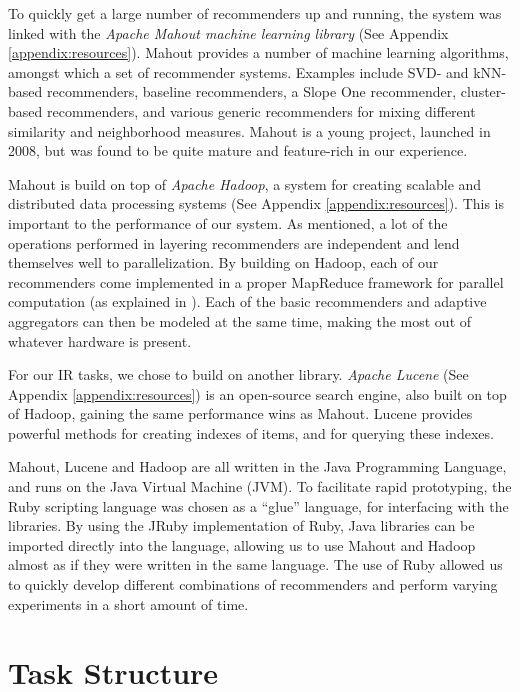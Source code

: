 To quickly get a large number of recommenders up and running,
the system was linked with the \emph{Apache Mahout machine learning library}
(See Appendix \ref{appendix:resources}). 
Mahout provides a number of machine learning
algorithms, amongst which a set of recommender systems.
Examples include SVD- and kNN-based recommenders,
baseline recommenders, a Slope One recommender,
cluster-based recommenders,
and various generic recommenders for mixing different 
similarity and neighborhood measures.
Mahout is a young project, launched in 2008, 
but was found to be quite mature and feature-rich
in our experience.

Mahout is build on top of \emph{Apache Hadoop},
a system for creating scalable and distributed data processing systems 
(See Appendix \ref{appendix:resources}).
This is important to the performance of our system.
As mentioned, a lot of the operations performed in layering recommenders
are independent and lend themselves well to parallelization.
By building on Hadoop, each of our recommenders come implemented in a 
proper MapReduce framework for parallel computation (as explained in \citet[p75]{Manning2008}).
Each of the basic recommenders and adaptive aggregators can then be modeled at the same time,
making the most out of whatever hardware is present.

For our IR tasks, we chose to build on another library.
\emph{Apache Lucene} (See Appendix \ref{appendix:resources}) is an open-source search engine, also built on top of Hadoop,
gaining the same performance wins as Mahout.
Lucene provides powerful methods for creating indexes of items, and for querying these indexes.

Mahout, Lucene and Hadoop are all written in the Java Programming Language,
and runs on the Java Virtual Machine (JVM).
To facilitate rapid prototyping, the Ruby scripting language was chosen as a ``glue'' language,
for interfacing with the libraries. 
By using the JRuby implementation of Ruby, Java libraries can be imported directly
into the language, allowing us to use Mahout and Hadoop almost as if they were written in the same language.
The use of Ruby allowed us to quickly develop different combinations of recommenders and
perform varying experiments in a short amount of time.

\section{Task Structure}

